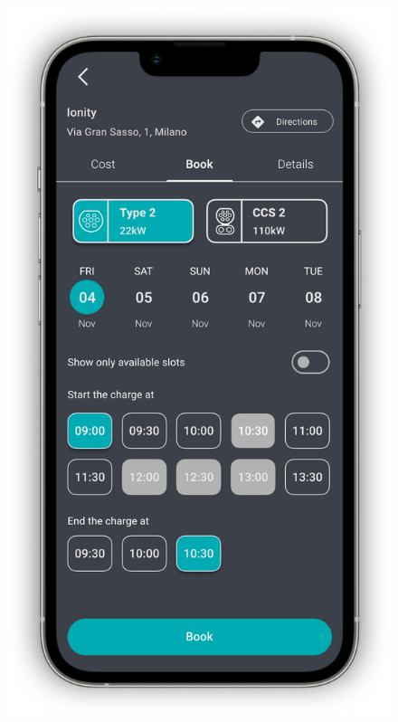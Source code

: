 \begin{figure}[H]
{        \includegraphics[scale=0.32]{src/mockups/book_charge.png}
    }
\end{figure}
